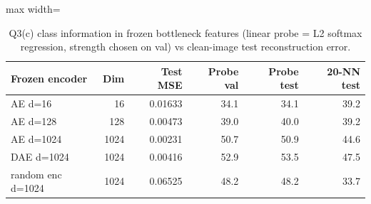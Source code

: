 \begin{table}[t]
\centering
\footnotesize
\setlength{\tabcolsep}{3.5pt}
\begin{adjustbox}{max width=\linewidth}
\begin{tabular}{lrrrrr}
\toprule
Frozen encoder & Dim & Test MSE & Probe val & Probe test & 20-NN test \\
\midrule
AE d=16 & 16 & 0.01633 & 34.1 & 34.1 & 39.2 \\
AE d=128 & 128 & 0.00473 & 39.0 & 40.0 & 39.2 \\
AE d=1024 & 1024 & 0.00231 & 50.7 & 50.9 & 44.6 \\
DAE d=1024 & 1024 & 0.00416 & 52.9 & 53.5 & 47.5 \\
random enc d=1024 & 1024 & 0.06525 & 48.2 & 48.2 & 33.7 \\
\bottomrule
\end{tabular}
\end{adjustbox}
\caption{Q3(c) class information in frozen bottleneck features (linear probe = L2 softmax regression, strength chosen on val) vs clean-image test reconstruction error.}
\label{tab:q3c}
\end{table}
